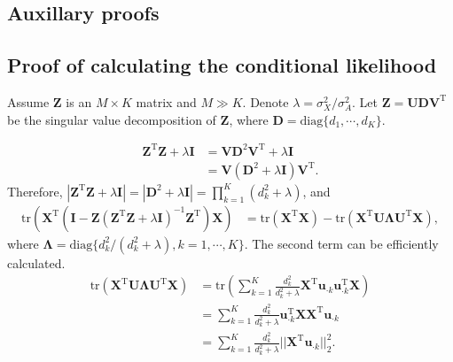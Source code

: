 \documentclass{article}
\begin{document}
\newpage
\begin{appendices}
  \section{Auxillary proofs}
  \subsection{Proof of calculating the conditional likelihood}\label{app::proof1}
    Assume $\mathbf{Z}$ is an $M\times K$ matrix and $M\gg K$. Denote $\lambda = \sigma_X^2 / \sigma_A^2$.
    Let $\mathbf{Z} = \mathbf{U}\mathbf{D}\mathbf{V}^\mathrm{T}$ be the singular value decomposition of $\mathbf{Z}$, where $\mathbf{D} = \mathrm{diag}\{d_1,\cdots, d_K\}$. 

    $$
    \begin{aligned}
      \mathbf{Z}^\mathrm{T}\mathbf{Z} + \lambda \mathbf{I} &= \mathbf{V}\mathbf{D}^2 \mathbf{V}^\mathrm{T} + \lambda \mathbf{I} \\
      &= \mathbf{V} (\mathbf{D}^2 + \lambda \mathbf{I}) \mathbf{V}^\mathrm{T}.
    \end{aligned}
    $$
    Therefore, $|{\mathbf{Z}}^{\mathrm{T}}\mathbf{Z} + \lambda \mathbf{I}| = |\mathbf{D}^2 + \lambda \mathbf{I}| = \prod_{k=1}^K (d_k^2 + \lambda)$, and
    $$
    \begin{aligned}
      \mathrm{tr}\left( \mathbf{X}^\mathrm{T} \left(\mathbf{I} -  \mathbf{Z} \left(\mathbf{Z}^\mathrm{T}\mathbf{Z} + \lambda \mathbf{I} \right)^{-1} \mathbf{Z}^\mathrm{T} \right) \mathbf{X} \right) &= \mathrm{tr}\left( {\mathbf{X}}^{\mathrm{T}} \mathbf{X}\right) - \mathrm{tr}\left( \mathbf{X}^\mathrm{T}\mathbf{U}\mathbf{\Lambda}\mathbf{U}^\mathrm{T}\mathbf{X} \right),
    \end{aligned}
    $$
    where $\mathbf{\Lambda} = \mathrm{diag}\{d_k^2/(d_k^2 + \lambda), k = 1,\cdots, K\}$. 
    The second term can be efficiently calculated. $$
    \begin{aligned}
      \mathrm{tr}(\mathbf{X}^\mathrm{T}\mathbf{U}\mathbf{\Lambda}\mathbf{U}^\mathrm{T}\mathbf{X}) &= \mathrm{tr}\left(\sum_{k = 1}^K \frac{d_k^2}{d_k^2 + \lambda}{\mathbf{X}}^{\mathrm{T}}\boldsymbol{u}_{\cdot k}\boldsymbol{u}_{\cdot k}^\mathrm{T}\mathbf{X}\right) \\
      &= \sum_{k=1}^K \frac{d_k^2}{d_k^2 + \lambda}\boldsymbol{u}_{\cdot k}^\mathrm{T}\mathbf{X}{\mathbf{X}}^{\mathrm{T}}\boldsymbol{u}_{\cdot k}\\ 
      &= \sum_{k=1}^K \frac{d_k^2}{d_k^2 + \lambda}||{\mathbf{X}}^{\mathrm{T}}\boldsymbol{u}_{\cdot k}||_2^2.
    \end{aligned}
    $$

\end{appendices}
\end{document}
